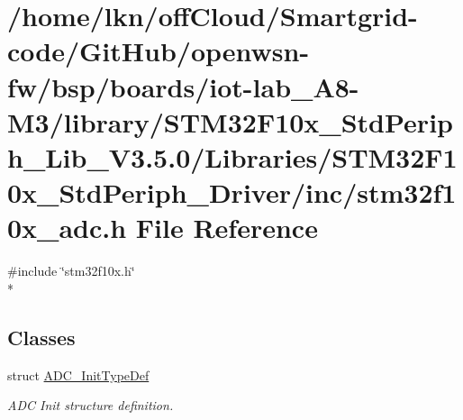 \hypertarget{iot-lab___a8-_m3_2library_2_s_t_m32_f10x___std_periph___lib___v3_85_80_2_libraries_2_s_t_m32_f10b301b00d9526fe3969f3aadb75092af3}{}\section{/home/lkn/off\+Cloud/\+Smartgrid-\/code/\+Git\+Hub/openwsn-\/fw/bsp/boards/iot-\/lab\+\_\+\+A8-\/\+M3/library/\+S\+T\+M32\+F10x\+\_\+\+Std\+Periph\+\_\+\+Lib\+\_\+\+V3.5.0/\+Libraries/\+S\+T\+M32\+F10x\+\_\+\+Std\+Periph\+\_\+\+Driver/inc/stm32f10x\+\_\+adc.h File Reference}
\label{iot-lab___a8-_m3_2library_2_s_t_m32_f10x___std_periph___lib___v3_85_80_2_libraries_2_s_t_m32_f10b301b00d9526fe3969f3aadb75092af3}
{\ttfamily \#include \char`\"{}stm32f10x.\+h\char`\"{}}\\*
\subsection*{Classes}
\begin{DoxyCompactItemize}
\item 
struct \hyperlink{struct_a_d_c___init_type_def}{A\+D\+C\+\_\+\+Init\+Type\+Def}
\begin{DoxyCompactList}\small\item\em A\+DC Init structure definition. \end{DoxyCompactList}\end{DoxyCompactItemize}
